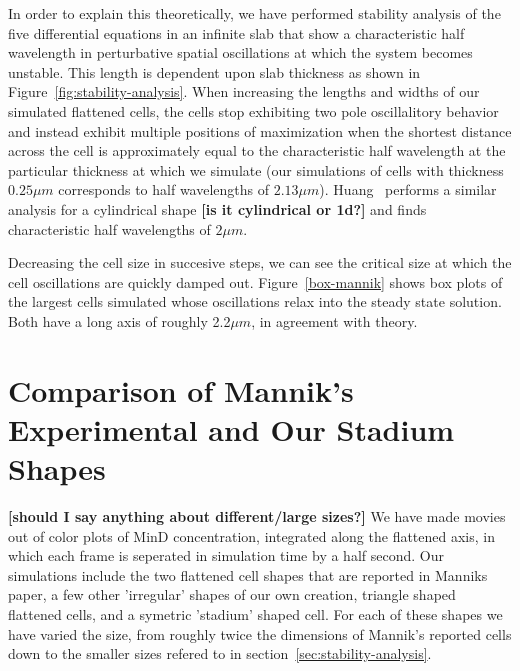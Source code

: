 \documentclass[letterpaper,twocolumn,amsmath,amssymb,pre]{revtex4-1}
\newcommand{\red}[1]{{\bf \color{red} #1}}
\newcommand{\fixme}[1]{\red{[#1]}}
\begin{document}
In order to explain this theoretically, we have performed stability
analysis of the five differential equations in an infinite slab that
show a characteristic half wavelength in perturbative spatial
oscillations at which the system becomes unstable.  This length is
dependent upon slab thickness as shown in
Figure~\ref{fig:stability-analysis}.  When increasing the lengths and
widths of our simulated flattened cells, the cells stop exhibiting two
pole oscillalitory behavior and instead exhibit multiple positions of
maximization when the shortest distance across the cell is
approximately equal to the characteristic half wavelength at the
particular thickness at which we simulate (our simulations of cells
with thickness $0.25\mu m$ corresponds to half wavelengths of $2.13\mu
m$).  Huang~\cite{huang2003dynamic} performs a similar analysis for a
cylindrical shape \fixme{is it cylindrical or 1d?} and finds
characteristic half wavelengths of $2\mu m$.


Decreasing the cell size in succesive steps, we can see the critical
size at which the cell oscillations are quickly damped out.
Figure~\ref{box-mannik} shows box plots of the largest cells simulated
whose oscillations relax into the steady state solution.  Both have a
long axis of roughly 2.2$\mu m$, in agreement with theory.

\section{Comparison of Mannik's Experimental and Our Stadium Shapes}
\fixme{should I say anything about different/large sizes?}  We have
made movies out of color plots of MinD concentration, integrated along
the flattened axis, in which each frame is seperated in simulation
time by a half second. Our simulations include the two flattened cell
shapes that are reported in Manniks paper, a few other 'irregular'
shapes of our own creation, triangle shaped flattened cells, and a
symetric 'stadium' shaped cell. For each of these shapes we have
varied the size, from roughly twice the dimensions of Mannik's
reported cells down to the smaller sizes refered to in
section~\ref{sec:stability-analysis}.
\end{document}
